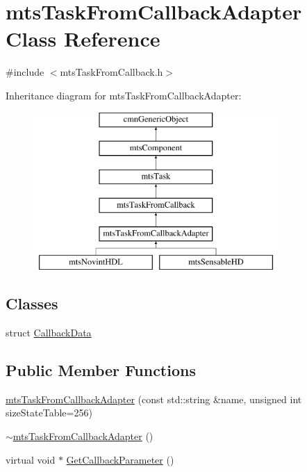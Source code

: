 \hypertarget{classmts_task_from_callback_adapter}{}\section{mts\+Task\+From\+Callback\+Adapter Class Reference}
\label{classmts_task_from_callback_adapter}


{\ttfamily \#include $<$mts\+Task\+From\+Callback.\+h$>$}

Inheritance diagram for mts\+Task\+From\+Callback\+Adapter\+:\begin{figure}[H]
\begin{center}
\leavevmode
\includegraphics[height=6.000000cm]{dc/d60/classmts_task_from_callback_adapter}
\end{center}
\end{figure}
\subsection*{Classes}
\begin{DoxyCompactItemize}
\item 
struct \hyperlink{structmts_task_from_callback_adapter_1_1_callback_data}{Callback\+Data}
\end{DoxyCompactItemize}
\subsection*{Public Member Functions}
\begin{DoxyCompactItemize}
\item 
\hyperlink{classmts_task_from_callback_adapter_a947196044b8b4849a0ab79fa054dae80}{mts\+Task\+From\+Callback\+Adapter} (const std\+::string \&name, unsigned int size\+State\+Table=256)
\item 
\hyperlink{classmts_task_from_callback_adapter_ac6a5ae13c1e7c75002a77cac3a8c481a}{$\sim$mts\+Task\+From\+Callback\+Adapter} ()
\item 
virtual void $\ast$ \hyperlink{classmts_task_from_callback_adapter_ae601440d7960f78f80a633e84176bfac}{Get\+Callback\+Parameter} ()
\end{DoxyCompactItemize}
